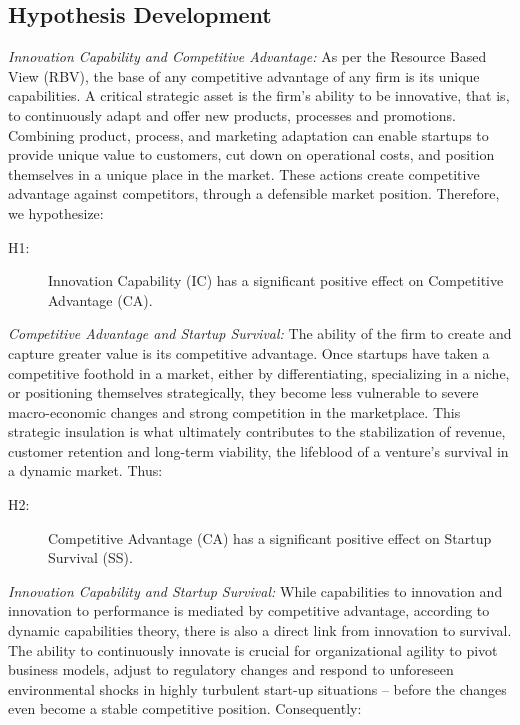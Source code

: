 \documentclass{ieeeaccess}
\begin{document}
\subsection{Hypothesis Development}

\textit{Innovation Capability and Competitive Advantage:}
As per the Resource Based View (RBV), the base of any competitive advantage of any firm is its unique capabilities. A critical strategic asset is the firm's ability to be innovative, that is, to continuously adapt and offer new products, processes and promotions. Combining product, process, and marketing adaptation can enable startups to provide unique value to customers, cut down on operational costs, and position themselves in a unique place in the market. These actions create competitive advantage against competitors, through a defensible market position. Therefore, we hypothesize:

\begin{description}
  \item[H1:] Innovation Capability (IC) has a significant positive effect on Competitive Advantage (CA).
\end{description}

\textit{Competitive Advantage and Startup Survival:}
The ability of the firm to create and capture greater value is its competitive advantage. Once startups have taken a competitive foothold in a market, either by differentiating, specializing in a niche, or positioning themselves strategically, they become less vulnerable to severe macro-economic changes and strong competition in the marketplace. This strategic insulation is what ultimately contributes to the stabilization of revenue, customer retention and long-term viability, the lifeblood of a venture's survival in a dynamic market. Thus:

\begin{description}
  \item[H2:] Competitive Advantage (CA) has a significant positive effect on Startup Survival (SS).
\end{description}

\textit{Innovation Capability and Startup Survival:}
While capabilities to innovation and innovation to performance is mediated by competitive advantage, according to dynamic capabilities theory, there is also a direct link from innovation to survival. The ability to continuously innovate is crucial for organizational agility to pivot business models, adjust to regulatory changes and respond to unforeseen environmental shocks in highly turbulent start-up situations – before the changes even become a stable competitive position. Consequently:
\end{document}
